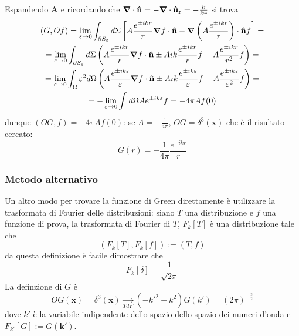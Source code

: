 Espandendo $\mathbf{A}$ e ricordando che $\gradient\cdot\mathbf{\hat n}=-\gradient\cdot\mathbf{\hat u_r}=-\pdv{}{r}$
si trova
\begin{gather*}
(G,Of) = \lim\limits_{\varepsilon\to0}\int_{\partial S_\varepsilon}^{}d\Sigma
\left[A\frac{e^{\pm ikr}}{r}\gradient f\cdot\mathbf{\hat n}-\gradient\left(A\frac{e^{\pm ikr}}{r}
\right)\cdot\mathbf{\hat n}f\right]=\\
=\lim\limits_{\varepsilon\to0}\int_{\partial S_\varepsilon}^{}d\Sigma
\left(A\frac{e^{\pm ikr}}{r}\gradient f\cdot\mathbf{\hat n} \pm Aik\frac{e^{\pm ikr}}{r}f -
A\frac{e^{\pm ikr}}{r^2}f\right)=\\=
\lim\limits_{\varepsilon\to0}\int_{\Omega}^{} \varepsilon^2d\Omega
\left(A\frac{e^{\pm ik\varepsilon}}{\varepsilon}\gradient f\cdot\mathbf{\hat n} \pm Aik
\frac{e^{\pm ik\varepsilon}}{\varepsilon}f - A\frac{e^{\pm ik\varepsilon}}{\varepsilon^2}f\right)=\\=
-\lim\limits_{\varepsilon\to0}\int_{}^{}d\Omega Ae^{\pm ik\varepsilon}f = -4\pi Af(0)
\end{gather*}
dunque $(OG,f)=-4\pi Af(0)$: se $A=-\frac{1}{4\pi}$, $OG=\delta^3(\mathbf{x})$ che è il risultato
cercato:
$$\boxed{G(r) = -\frac{1}{4\pi}\frac{e^{\pm ikr}}{r}}$$
\subsubsection{Metodo alternativo}
Un altro modo per trovare la funzione di Green direttamente è utilizzare la trasformata di Fourier
delle distribuzioni: siano $T$ una distribuzione e $f$ una funzione di prova,
la trasformata di Fourier di $T$, $F_k[T]$ è una distribuzione tale che
$$(F_k[T],F_k[f]) := (T,f)$$
da questa definizione è facile dimostrare che
$$F_k[\delta]=\frac{1}{\sqrt{2\pi}}$$
La definzione di $G$ è
$$OG(\mathbf{x})=\delta^3(\mathbf{x})\underset{TdF}\rightarrow
(-k'^2+k^2)G(k')=(2\pi)^{-\frac{3}{2}}$$
dove $k'$ è la variabile indipendente dello spazio dello spazio dei numeri d'onda e
$F_{k'}[G]:=G(\mathbf{k'})$.


